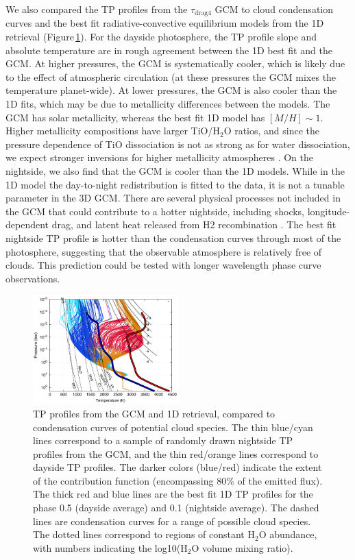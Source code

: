 \documentclass[twocolumn, trackchanges]{aastex61}
\begin{document}
We also compared the TP profiles from the $\tau_\mathrm{drag4}$ GCM to cloud condensation curves and the best fit radiative-convective equilibrium models from the 1D retrieval (Figure\,\ref{fig:TP}).  For the dayside photosphere, the TP profile slope and absolute temperature are in rough agreement between the 1D best fit and the GCM. At higher pressures, the GCM is systematically cooler, which is likely due to the effect of atmospheric circulation (at these pressures the GCM mixes the temperature planet-wide). At lower pressures, the GCM is also cooler than the 1D fits, which may be due to metallicity differences between the models. The GCM has solar metallicity, whereas the best fit 1D model has $[M/H] \sim 1$. Higher metallicity compositions have larger TiO/H$_2$O ratios, and since the pressure dependence of TiO dissociation is not as strong as for water dissociation, we expect stronger inversions for higher metallicity atmospheres \citep{parmentier18}.  On the nightside, we also find that the GCM is cooler than the 1D models.  While in the 1D model the day-to-night redistribution is fitted to the data, it is not a tunable parameter in the 3D GCM. There are several physical processes not included in the GCM that could contribute to a hotter nightside, including shocks, longitude-dependent drag, and latent heat released from H2 recombination \citep{bell18}.  The best fit nightside TP profile is hotter than the condensation curves through most of the photosphere, suggesting that the observable atmosphere is relatively free of clouds. This prediction could be tested with longer wavelength phase curve observations.


\begin{figure}
\includegraphics[width = 0.5\textwidth]{fig14.pdf}
\caption{TP profiles from the GCM and 1D retrieval, compared to condensation curves of potential cloud species. The thin blue/cyan lines correspond to a sample of randomly drawn nightside TP profiles from the GCM, and the thin red/orange lines correspond to dayside TP profiles. The darker colors (blue/red) indicate the extent of the contribution function (encompassing 80\% of the emitted flux). The thick red and blue lines are the best fit 1D TP profiles for the phase 0.5 (dayside average) and 0.1 (nightside average). The dashed lines are condensation curves for a range of possible cloud species.  The dotted lines correspond to regions of constant H$_2$O abundance, with numbers indicating the log10(H$_2$O volume mixing ratio).}
\label{fig:TP}
\end{figure}
\end{document}

